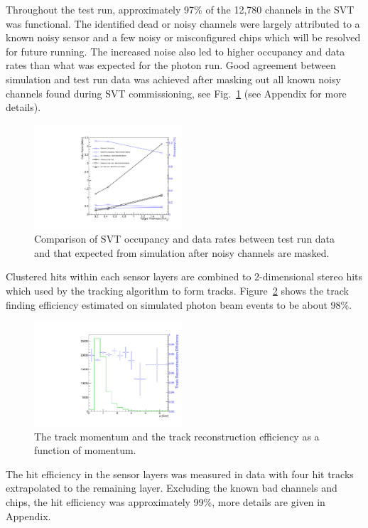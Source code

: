 Throughout the test run, approximately 97\% of the 12,780 channels in the SVT was functional. The identified dead or noisy channels were largely attributed to a 
known noisy sensor and a few noisy or misconfigured chips which will be resolved for future running. The 
increased noise also led to higher occupancy and data rates than what was expected for the photon run. 
Good agreement between simulation and test run data was achieved after masking out all known noisy 
channels found during SVT commissioning, see Fig.~\ref{fig:data_rates_data_mc_cmp} (see Appendix for more details). 
\begin{figure}[h]
    \includegraphics[width=0.49\textwidth]{test2012/svtperformance/daq/data_rates.pdf}
        \caption{ { \small
                    Comparison of SVT occupancy and data rates between test run data and that expected from simulation after noisy channels are masked.
                } }
	\label{fig:data_rates_data_mc_cmp}
\end{figure}


Clustered hits within each sensor layers are combined to 2-dimensional stereo hits which used by the tracking 
algorithm to form tracks. Figure~\ref{fig:hit_track_efficiency} shows the track finding efficiency estimated on simulated photon beam events to be about 98\%. 
\begin{figure}[h]
    	\includegraphics[width=0.49\textwidth]{test2012/svtperformance/trk_performance/track_reco_efficiency.pdf}
        \caption{{\small The track momentum and the track reconstruction efficiency
      	as a function of momentum.}} 
	\label{fig:hit_track_efficiency}
\end{figure}
The hit efficiency in the sensor layers was measured in data with four hit tracks extrapolated to the remaining layer. Excluding the known bad channels and chips, the hit efficiency was approximately 99\%, more details are given in Appendix. 


